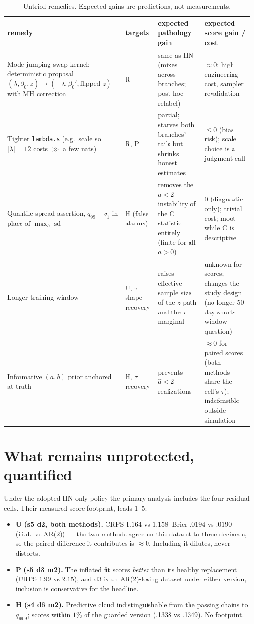 \documentclass[11pt]{article}
\newcommand{\code}[1]{\texttt{#1}}
\DeclareMathOperator{\sd}{sd}
\begin{document}
\begin{table}[ht]
\centering
\caption{Untried remedies. Expected gains are predictions, not
measurements.}
\label{tab:untried}
\small
\begin{tabular}{p{}p{}p{}p{}}
\toprule
remedy & targets & expected pathology gain & expected score gain / cost \\
\midrule
Mode-jumping swap kernel: deterministic proposal
$(\lambda, \beta_0, z) \to (-\lambda, \beta_0', \text{flipped } z)$
with MH correction & R &
same as HN (mixes across branches; post-hoc relabel) &
$\approx 0$; high engineering cost, sampler revalidation \\
\addlinespace
Tighter \code{lambda.s} (e.g.\ scale so $|\lambda|=12$ costs
$\gg$ a few nats) & R, P &
partial; starves both branches' tails but shrinks honest estimates &
$\le 0$ (bias risk); scale choice is a judgment call \\
\addlinespace
Quantile-spread assertion, $q_{99}-q_{1}$ in place of $\max_h \sd$ & H
(false alarms) &
removes the $a<2$ instability of the C statistic entirely
(finite for all $a>0$) &
$0$ (diagnostic only); trivial cost; moot while C is descriptive \\
\addlinespace
Longer training window & U, $\tau$-shape recovery &
raises effective sample size of the $z$ path and the $\tau$ marginal &
unknown for scores; changes the study design (no longer $50$-day
short-window question) \\
\addlinespace
Informative $(a, b)$ prior anchored at truth & H, $\tau$ recovery &
prevents $\hat a < 2$ realizations &
$\approx 0$ for paired scores (both methods share the cell's $\tau$);
indefensible outside simulation \\
\bottomrule
\end{tabular}
\end{table}

\section{What remains unprotected, quantified}

Under the adopted HN-only policy the primary analysis includes the four
residual cells. Their measured score footprint, leads 1--5:

\begin{itemize}\itemsep2pt
  \item \textbf{U (s5 d2, both methods).} CRPS $1.164$ vs $1.158$,
        Brier $.0194$ vs $.0190$ (i.i.d.\ vs AR(2)) --- the two methods
        agree on this dataset to three decimals, so the paired
        difference it contributes is $\approx 0$. Including it dilutes,
        never distorts.
  \item \textbf{P (s5 d3 m2).} The inflated fit scores \emph{better}
        than its healthy replacement (CRPS $1.99$ vs $2.15$), and d3 is
        an AR(2)-losing dataset under either version; inclusion is
        conservative for the headline.
  \item \textbf{H (s4 d6 m2).} Predictive cloud indistinguishable from
        the passing chains to $q_{99.9}$; scores within $1\%$ of the
        guarded version (.1338 vs .1349). No footprint.
\end{itemize}
\end{document}
